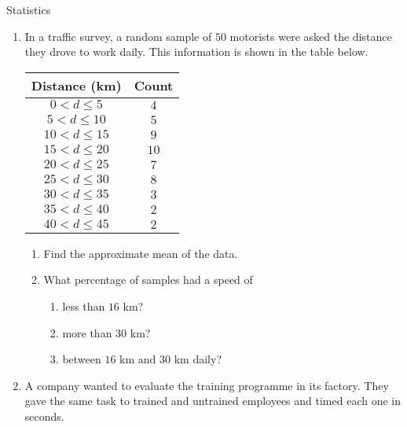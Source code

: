 \begin{eocexercises}{Statistics}
\begin{enumerate}
  \item In a traffic survey, a random sample of $50$ motorists were
    asked the distance they drove to work daily. This information is
    shown in the table below.
    \begin{center}
      \begin{tabular}{cc}
        \toprule
        Distance (km) & Count \\
        \midrule
        $0 < d \le 5$ & $4$ \\
        $5 < d \le 10$ & $5$ \\
        $10 < d \le 15$ & $9$ \\
        $15 < d \le 20$ & $10$ \\
        $20 < d \le 25$ & $7$ \\
        $25 < d \le 30$ & $8$ \\
        $30 < d \le 35$ & $3$ \\
        $35 < d \le 40$ & $2$ \\
        $40 < d \le 45$ & $2$ \\
        \bottomrule
      \end{tabular}
    \end{center}
    \begin{enumerate}
    \item Find the approximate mean of the data.
    \item What percentage of samples had a speed of
      \begin{enumerate}
      \item less than $16$ km?
      \item more than $30$ km?
      \item between $16$ km and $30$ km daily?
      \end{enumerate}
    \end{enumerate}

  \item A company wanted to evaluate the training programme in its
    factory. They gave the same task to trained and untrained
    employees and timed each one in seconds.


\end{enumerate}
\end{eocexercises}
